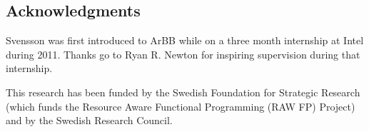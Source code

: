 %

 



\subsection*{Acknowledgments}
Svensson was first introduced to ArBB while on a three month internship at Intel
during 2011. Thanks go to Ryan R. Newton for inspiring supervision 
during that internship.

This research has been funded by the Swedish Foundation for
Strategic Research (which funds the Resource Aware Functional 
Programming (RAW FP) Project) and by the
Swedish Research Council.




%




